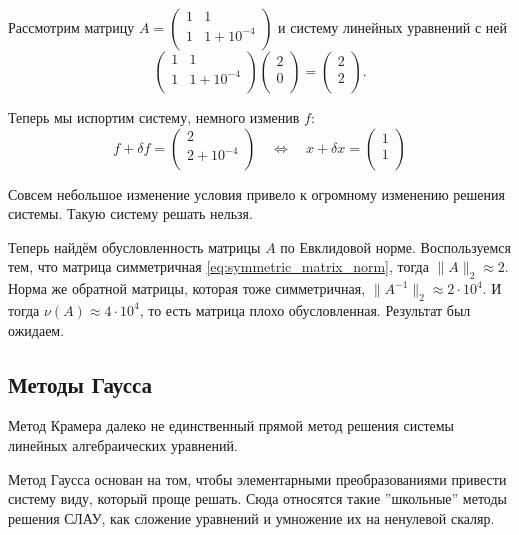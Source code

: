 \documentclass{article}
\begin{document}
\begin{example}
	Рассмотрим матрицу
	$A=
		\begin{pmatrix}
			1	& 1 \\
			1	& 1+10^{-4} \\
		\end{pmatrix}
	$
	и систему линейных уравнений с ней
	\[
		\begin{pmatrix}
			1	& 1 \\
			1	& 1+10^{-4} \\
		\end{pmatrix}
		\begin{pmatrix}
			2 \\
			0 \\
		\end{pmatrix}
		=
		\begin{pmatrix}
			2 \\
			2 \\
		\end{pmatrix}
		.
	\]

	Теперь мы испортим систему, немного изменив $f$:
	\[f+\delta f=
		\begin{pmatrix}
			2 \\
			2+10^{-4} \\
		\end{pmatrix}
		\quad\Leftrightarrow\quad
		x+\delta x=
		\begin{pmatrix}
			1 \\
			1 \\
		\end{pmatrix}
	\]

	Совсем небольшое изменение условия привело к огромному изменению
	решения системы. Такую систему решать нельзя.

	Теперь найдём обусловленность матрицы $A$ по Евклидовой норме.
	Воспользуемся тем, что матрица симметричная
	\eqref{eq:symmetric_matrix_norm}, тогда $\|A\|_2\approx 2$.
	Норма же обратной матрицы, которая тоже симметричная,
	$\|A^{-1}\|_2\approx 2\cdot 10^4$. И тогда $\nu(A)\approx
	4\cdot 10^4$, то есть матрица плохо обусловленная. Результат был
	ожидаем.
\end{example}

\newpage
\subsection{Методы Гаусса}
Метод Крамера далеко не единственный прямой метод решения системы линейных
алгебраических уравнений.

Метод Гаусса основан на том, чтобы элементарными преобразованиями привести
систему виду, который проще решать. Сюда относятся такие ''школьные'' методы
решения СЛАУ, как сложение уравнений и умножение их на ненулевой скаляр.
\end{document}
